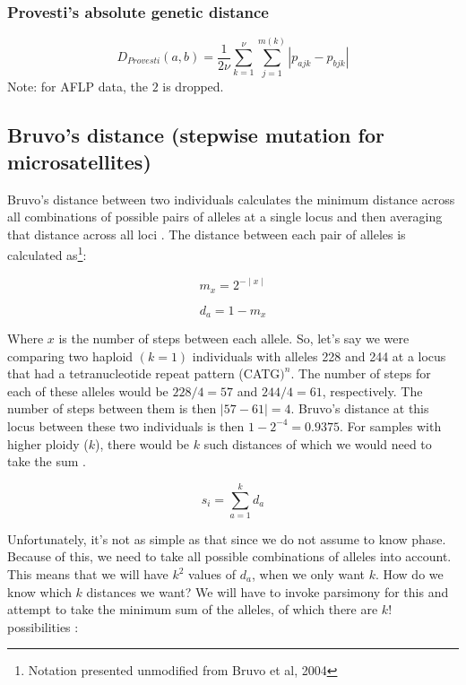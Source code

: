 \documentclass[letterpaper]{article}\usepackage[]{graphicx}\usepackage[]{color}
\begin{document}
\subsubsection{Provesti's absolute genetic distance}
\label{distance:provesti}
\begin{equation}
  D_{Provesti}(a,b)=\frac{1}{2{\nu}} \sum_{k=1}^{\nu} \sum_{j=1}^{m(k)}
  |p_{ajk} - p_{bjk}|
\end{equation}
Note: for AFLP data, the $2$ is dropped. 

\subsection{Bruvo's distance (stepwise mutation for microsatellites)}
\label{bruvo}

Bruvo's distance between two individuals calculates the minimum distance across
all combinations of possible pairs of alleles at a single locus and then
averaging that distance across all loci \citep{Bruvo:2004}. The distance between
each pair of alleles is calculated as\footnote{Notation presented unmodified
from Bruvo et al, 2004}\citep{Bruvo:2004}:

\begin{equation}
\label{eq:m_x}
m_x = 2^{-\mid x \mid}
\end{equation}

\begin{equation}
\label{eq:d_a}
d_a = 1 - m_x
\end{equation}

Where $x$ is the number of steps between each allele. So, let's say we were
comparing two haploid $(k = 1)$ individuals with alleles 228 and 244 at a locus
that had a tetranucleotide repeat pattern (CATG$)^n$. The number of steps for
each of these alleles would be $228/4 = 57$ and $244/4 =61$, respectively. The
number of steps between them is then $\mid 57 - 61 \mid = 4$. Bruvo's distance
at this locus between these two individuals is then $1-2^{-4} = 0.9375$. For
samples with higher ploidy ($k$), there would be $k$ such distances of which we
would need to take the sum \citep{Bruvo:2004}.

\begin{equation}
\label{eq:s_i}
s_i = \displaystyle \sum_{a=1}^{k} d_a
\end{equation}

Unfortunately, it's not as simple as that since we do not assume to know phase.
Because of this, we need to take all possible combinations of alleles into
account. This means that we will have $k^2$ values of $d_a$, when we only want
$k$. How do we know which $k$ distances we want? We will have to invoke
parsimony for this and attempt to take the minimum sum of the alleles, of which
there are $k!$ possibilities \citep{Bruvo:2004}:
\end{document}
